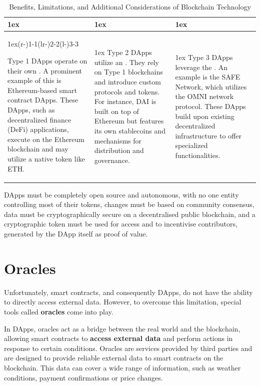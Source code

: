 \begin{table}[h]
\begin{tabularx}{\linewidth}{>{\parskip1ex}X@{\kern2\tabcolsep}>{\parskip1ex}X@{\kern2\tabcolsep}>{\parskip1ex}X}
\toprule
\hfil\bfseries \color{Orange}{Type 1}
&
\hfil\bfseries \color{Orange}{Type 2}
&
\hfil\bfseries \color{Orange}{Type 3}
\\\cmidrule(r{-\tabcolsep}){1-1}\cmidrule(lr{-\tabcolsep}){2-2}\cmidrule(l{-\tabcolsep}){3-3}

Type 1 DApps operate on their own \textbf{\color{Blue}{dedicated blockchain}}. A prominent example of this is Ethereum-based smart contract DApps. These DApps, such as decentralized finance (DeFi) applications, execute on the Ethereum blockchain and may utilize a native token like ETH.
&
Type 2 DApps utilize an \textbf{\color{Blue}{existing established blockchain}}. They rely on Type 1 blockchains and introduce custom protocols and tokens. For instance, DAI is built on top of Ethereum but features its own stablecoins and mechanisms for distribution and governance.
&
Type 3 DApps leverage the \textbf{\color{Blue}{protocols of Type 2 DApps}}. An example is the SAFE Network, which utilizes the OMNI network protocol. These DApps build upon existing decentralized infrastructure to offer specialized functionalities.
\\
\bottomrule
\end{tabularx}
\caption{Benefits, Limitations, and Additional Considerations of Blockchain Technology}
\end{table}

DApps must be completely open source and autonomous, with no one entity controlling most of their tokens, changes must be based on community consensus, data must be cryptographically secure on a decentralised public blockchain, and a cryptographic token must be used for access and to incentivise contributors, generated by the DApp itself as proof of value.

\section{Oracles}
Unfortunately, smart contracts, and consequently DApps, do not have the ability to directly access external data. However, to overcome this limitation, special tools called \textbf{oracles} come into play. 

In DApps, oracles act as a bridge between the real world and the blockchain, allowing smart contracts to \textbf{access external data} and perform actions in response to certain conditions. Oracles are services provided by third parties and are designed to provide reliable external data to smart contracts on the blockchain. This data can cover a wide range of information, such as weather conditions, payment confirmations or price changes.

